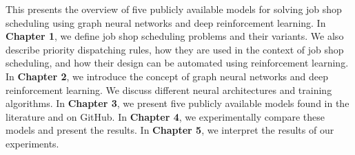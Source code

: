 \par
This presents the overview of five publicly available models for solving job shop scheduling using graph neural networks and deep reinforcement learning. In \textbf{Chapter 1}, we define job shop scheduling problems and their variants. We also describe priority dispatching rules, how they are used in the context of job shop scheduling, and how their design can be automated using reinforcement learning. In \textbf{Chapter 2}, we introduce the concept of graph neural networks and deep reinforcement learning. We discuss different neural architectures and training algorithms. In \textbf{Chapter 3}, we present five publicly available models found in the literature and on GitHub. In \textbf{Chapter 4}, we experimentally compare these models and present the results. In \textbf{Chapter 5}, we interpret the results of our experiments.
